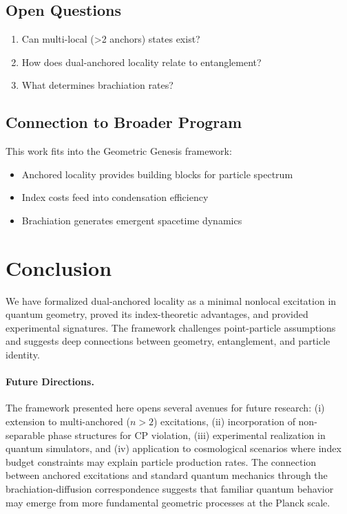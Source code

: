\documentclass[11pt]{article}
\theoremstyle{plain}
\theoremstyle{definition}
\begin{document}
\subsection{Open Questions}
\begin{enumerate}
  \item Can multi-local (>2 anchors) states exist?
  \item How does dual-anchored locality relate to entanglement?
  \item What determines brachiation rates?
\end{enumerate}

\subsection{Connection to Broader Program}
This work fits into the Geometric Genesis framework:
\begin{itemize}
  \item Anchored locality provides building blocks for particle spectrum
  \item Index costs feed into condensation efficiency
  \item Brachiation generates emergent spacetime dynamics
\end{itemize}

\section{Conclusion}
We have formalized dual-anchored locality as a minimal nonlocal excitation in quantum geometry, proved its index-theoretic advantages, and provided experimental signatures. The framework challenges point-particle assumptions and suggests deep connections between geometry, entanglement, and particle identity.

\paragraph{Future Directions.}
The framework presented here opens several avenues for future research: (i) extension to multi-anchored ($n>2$) excitations, (ii) incorporation of non-separable phase structures for CP violation, (iii) experimental realization in quantum simulators, and (iv) application to cosmological scenarios where index budget constraints may explain particle production rates. The connection between anchored excitations and standard quantum mechanics through the brachiation-diffusion correspondence suggests that familiar quantum behavior may emerge from more fundamental geometric processes at the Planck scale.
\end{document}
